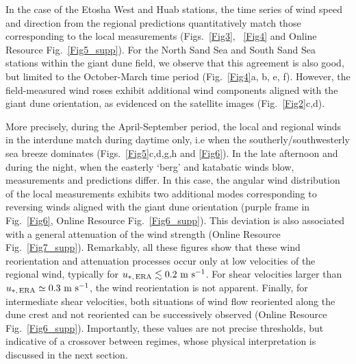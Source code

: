 In the case of the Etosha West and Huab stations, the time series of wind speed and direction from the regional predictions quantitatively match those corresponding to the local measurements (Figs.~\ref{Fig3}, ~\ref{Fig4} and Online Resource Fig.~\ref{Fig5_supp}). For the North Sand Sea and South Sand Sea stations within the giant dune field, we observe that this agreement is also good, but limited to the October-March time period (Fig.~\ref{Fig4}a, b, e, f). However, the field-measured wind roses exhibit additional wind components aligned with the giant dune orientation, as evidenced on the satellite images (Fig.~\ref{Fig2}c,d).

More precisely, during the April-September period, the local and regional winds in the interdune match during daytime only, i.e when the southerly/southwesterly sea breeze dominates (Figs.~\ref{Fig5}c,d,g,h and \ref{Fig6}). In the late afternoon and during the night, when the easterly `berg' and katabatic winds blow, measurements and predictions differ. In this case, the angular wind distribution of the local measurements exhibits two additional modes corresponding to reversing winds aligned with the giant dune orientation (purple frame in Fig.~\ref{Fig6}, Online Resource Fig.~\ref{Fig6_supp}). This deviation is also associated with a general attenuation of the wind strength (Online Resource Fig.~\ref{Fig7_supp}). Remarkably, all these figures show that these wind reorientation and attenuation processes occur only at low velocities of the regional wind, typically for $u_{*, \, \textup{ERA}} \lesssim 0.2~\textrm{m}~\textrm{s}^{-1}$. For shear velocities larger than $u_{*, \, \textup{ERA}} \simeq 0.3~\textrm{m}~\textrm{s}^{-1}$, the wind reorientation is not apparent. Finally, for intermediate shear velocities, both situations of wind flow reoriented along the dune crest and not reoriented can be successively observed (Online Resource Fig.~\ref{Fig6_supp}). Importantly, these values are not precise thresholds, but indicative of a crossover between regimes, whose physical interpretation is discussed in the next section.


